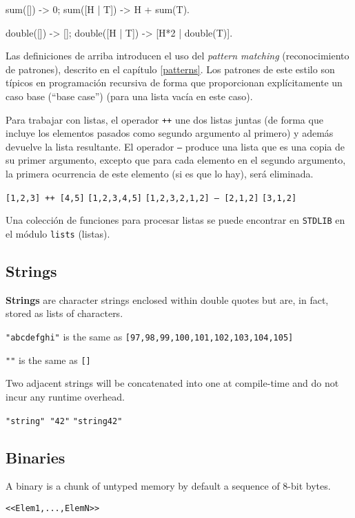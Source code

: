 \begin{erlang}
sum([]) -> 0;
sum([H | T]) -> H + sum(T).

double([]) -> [];
double([H | T]) -> [H*2 | double(T)].
\end{erlang}

Las definiciones de arriba introducen el uso del \textit{pattern matching} (reconocimiento de patrones), descrito en el capítulo \ref{patterns}. Los patrones de este estilo son típicos en programación recursiva de forma que proporcionan explícitamente un caso base (``base case'') (para una lista vacía en este caso). 

Para trabajar con listas, el operador \texttt{++} une dos listas juntas (de forma que incluye los elementos pasados como segundo argumento al primero) y además devuelve la lista resultante. El operador \texttt{--} produce una lista que es una copia de su primer argumento, excepto que para cada elemento en el segundo argumento, la primera ocurrencia de este elemento (si es que lo hay), será eliminada. 

\texttt{[1,2,3] ++ [4,5]} \resultingin \texttt{[1,2,3,4,5]}
\texttt{[1,2,3,2,1,2] -- [2,1,2]} \resultingin \texttt{[3,1,2]}

Una colección de funciones para procesar listas se puede encontrar en \texttt{STDLIB} en el módulo \texttt{lists} (listas). 


\subsection{Strings}
\label{datatypes:string}
\textbf{Strings} are character strings enclosed within double quotes
but are, in fact, stored as lists of characters.

\texttt{"abcdefghi"} is the same as \texttt{[97,98,99,100,101,102,103,104,105]}

\texttt{""} is the same as \texttt{[]}

Two adjacent strings will be concatenated into one at compile-time and
do not incur any runtime overhead.

\texttt{"string" "42"} \resultingin \texttt{"string42"}


\subsection{Binaries}
\label{datatypes:binary}
A binary is a chunk of untyped memory by default a sequence of 8-bit
bytes.

\texttt{<}\texttt{<Elem1,...,ElemN>}\texttt{>}

